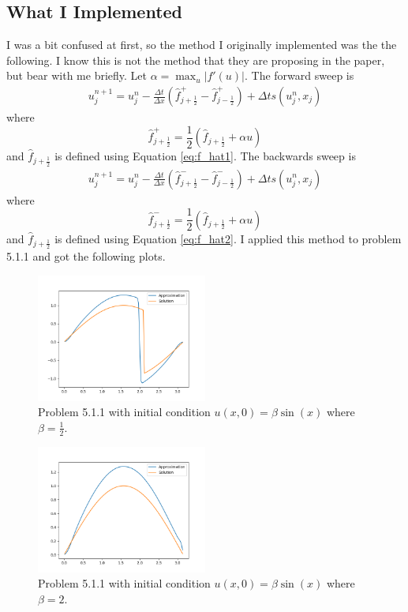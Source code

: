 \documentclass{article}
\def\^{\hat}
\begin{document}
\subsection*{What I Implemented}
I was a bit confused at first, so the method I originally implemented was the the following. I know this is not the method that they are proposing in the paper, but bear with me briefly. Let $\alpha = \max_u |f'(u)|$. The forward sweep is 
\begin{align*}
    u^{n+1}_{j} = u^n_j - \frac{\Delta t}{\Delta x} (\^f^+_{j + \frac{1}{2}} - \^f^+_{j - \frac{1}{2}}) + \Delta t s(u^n_j,x_j)
\end{align*}
where
\begin{equation*}
    \^f^+_{j + \frac{1}{2}} = \frac{1}{2}(\^f_{j + \frac{1}{2}} + \alpha u)
\end{equation*}
and $\^f_{j + \frac{1}{2}}$ is defined using Equation \ref{eq:f_hat1}. The backwards sweep is 
\begin{align*}
    u^{n+1}_{j} = u^n_j - \frac{\Delta t}{\Delta x} (\^f^-_{j + \frac{1}{2}} - \^f^-_{j - \frac{1}{2}}) + \Delta t s(u^n_j,x_j)
\end{align*}
where
\begin{equation*}
    \^f^-_{j + \frac{1}{2}} = \frac{1}{2}(\^f_{j + \frac{1}{2}} + \alpha u)
\end{equation*}
and $\^f_{j + \frac{1}{2}}$ is defined using Equation \ref{eq:f_hat2}. I applied this method to problem 5.1.1 and got the following plots. 
\begin{figure}[h]
    \centering
    \includegraphics[width=0.5\textwidth]{imgs/sol1.png}
    \caption{Problem 5.1.1 with initial condition $u(x,0) = \beta \sin(x)$ where $\beta = \frac{1}{2}$.}
    \label{fig:sol1}
\end{figure}
\begin{figure}[h]
    \centering
    \includegraphics[width=0.5\textwidth]{imgs/sol3.png}
    \caption{Problem 5.1.1 with initial condition $u(x,0) = \beta \sin(x)$ where $\beta = 2$.}
    \label{fig:sol2}
\end{figure}
\end{document}

